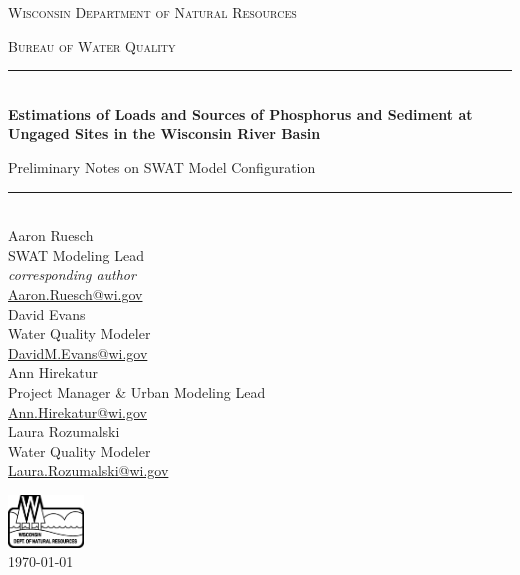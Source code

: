 \begin{titlepage}
\begin{center}
	\bigskip
	\textsc{ \Large  Wisconsin Department of Natural Resources}\par
	\medskip
	\textsc{ \Large Bureau of Water Quality}\par
	\bigskip
	\rule{\linewidth}{0.5mm} \\[0.4cm]
	\textbf{\Large Estimations of Loads and Sources of Phosphorus and Sediment at Ungaged Sites in the Wisconsin River Basin}\par
	\medskip
	{\Large Preliminary Notes on SWAT Model Configuration}\par
	\rule{\linewidth}{0.5mm} \\[0.4cm]
	\bigskip
	\noindent
	Aaron Ruesch \\
	SWAT Modeling Lead \\
	\textit{corresponding author} \\
	\href{mailto:Aaron.Ruesch@wi.gov}{Aaron.Ruesch@wi.gov} \\
	\medskip
	David Evans \\
	Water Quality Modeler \\
	\href{mailto:DavidM.Evans@wi.gov}{DavidM.Evans@wi.gov} \\
	\medskip
	Ann Hirekatur \\
	Project Manager \& Urban Modeling Lead \\
	\href{mailto:Ann.Hirekatur@wi.gov}{Ann.Hirekatur@wi.gov} \\
	\medskip
	Laura Rozumalski \\
	Water Quality Modeler \\
	\href{mailto:Laura.Rozumalski@wi.gov}{Laura.Rozumalski@wi.gov} \\

	\vfill
	
	\includegraphics[width=0.15\textwidth]{./img/DNR2.eps} \\
	\medskip
	{\large \today}
	
\end{center}
\end{titlepage}
